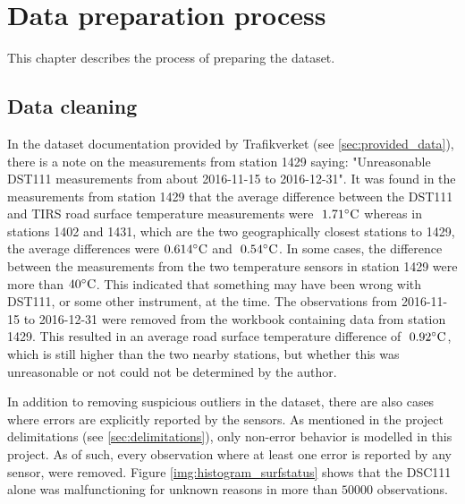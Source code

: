\chapter{Data preparation process}
This chapter describes the process of preparing the dataset.


\section{Data cleaning} \label{sec:datacleaning}
	 In the dataset documentation provided by Trafikverket (see \ref{sec:provided_data}), there is a note on the measurements from station 1429 saying: "Unreasonable DST111 measurements from about 2016-11-15 to 2016-12-31". It was found in the measurements from station 1429 that the average difference between the DST111 and TIRS road surface temperature measurements were $~1.71 \celsius$ whereas in stations 1402 and 1431, which are the two geographically closest stations to 1429, the average differences were $0.614 \celsius$ and  $~0.54 \celsius$. In some cases, the difference between the measurements from the two temperature sensors in station 1429 were more than $40 \celsius$. This indicated that something may have been wrong with DST111, or some other instrument, at the time. The observations from 2016-11-15 to 2016-12-31 were removed from the workbook containing data from station 1429. This resulted in an average road surface temperature difference of $~0.92 \celsius$, which is still higher than the two nearby stations, but whether this was unreasonable or not could not be determined by the author. 

	In addition to removing suspicious outliers in the dataset, there are also cases where errors are explicitly reported by the sensors. As mentioned in the project delimitations (see \ref{sec:delimitations}), only non-error behavior is modelled in this project. As of such, every observation where at least one error is reported by any sensor, were removed. Figure \ref{img:histogram_surfstatus} shows that the DSC111 alone was malfunctioning for unknown reasons in more than $50 000$ observations. 

